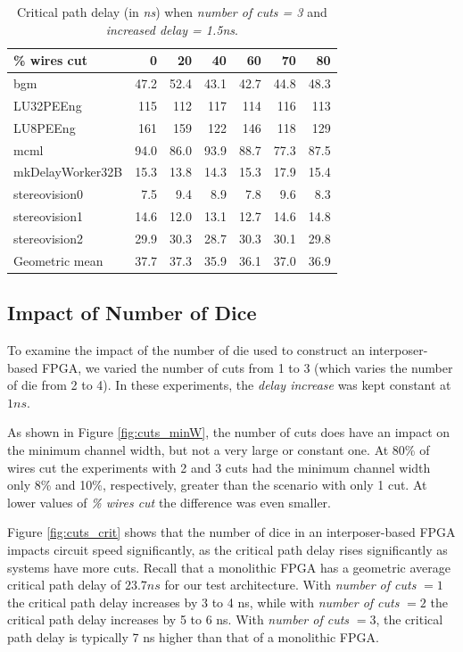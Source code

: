 \documentclass{sig-alternate-2013}
\begin{document}
\begin{table}[!htbp]
\begin{tabular}{|l|r|r|r|r|r|r|}
\hline
\% wires cut & 0 & 20 & 40 & 60 & 70 & 80 \\ \hline \hline
bgm & 47.2 & 52.4 & 43.1 & 42.7 & 44.8 & 48.3 \\ \hline
LU32PEEng & 115 & 112 & 117 & 114 & 116 & 113 \\ \hline
LU8PEEng & 161 & 159 & 122 & 146 & 118 & 129 \\ \hline
mcml & 94.0 & 86.0 & 93.9 & 88.7 & 77.3 & 87.5 \\ \hline
mkDelayWorker32B & 15.3 & 13.8 & 14.3 & 15.3 & 17.9 & 15.4 \\ \hline
stereovision0 & 7.5 & 9.4 & 8.9 & 7.8 & 9.6 & 8.3 \\ \hline
stereovision1 & 14.6 & 12.0 & 13.1 & 12.7 & 14.6 & 14.8 \\ \hline
stereovision2 & 29.9 & 30.3 & 28.7 & 30.3 & 30.1 & 29.8 \\ \hline
Geometric mean & 37.7 & 37.3 & 35.9 & 36.1 & 37.0 & 36.9 \\ \hline
\end{tabular}
\caption{Critical path delay (in \textit{ns}) when \textit{number of cuts = 3} and \textit{increased delay = 1.5ns}.}
\label{table:delay1500}
\end{table}


\subsection{Impact of Number of Dice}

To examine the impact of the number of die used to construct an interposer-based FPGA, we varied the number of cuts from 1 to 3 (which varies the number of die from 2 to 4).  In these experiments, the \textit{delay increase} was kept constant at $1ns$. 

As shown in Figure \ref{fig:cuts_minW}, the number of cuts does have an impact on the minimum channel width, but not a very large or constant one. At 80\% of wires cut the experiments with 2 and 3 cuts had the minimum channel width only 8\% and 10\%, respectively, greater than the scenario with only 1 cut. At lower values of \textit{\% wires cut} the difference was even smaller.

Figure \ref{fig:cuts_crit} shows that the number of dice in an interposer-based FPGA impacts circuit speed significantly, as the critical path delay rises significantly as systems have more cuts. Recall that a monolithic FPGA has a geometric average critical path delay of $23.7ns$ for our test architecture. With \textit{number of cuts} $= 1$ the critical path delay increases by 3 to 4 ns, while with \textit{number of cuts} $= 2$ the critical path delay increases by 5 to 6 ns. With \textit{number of cuts} $= 3$, the critical path delay is typically 7 ns higher than that of a monolithic FPGA.
\end{document}
